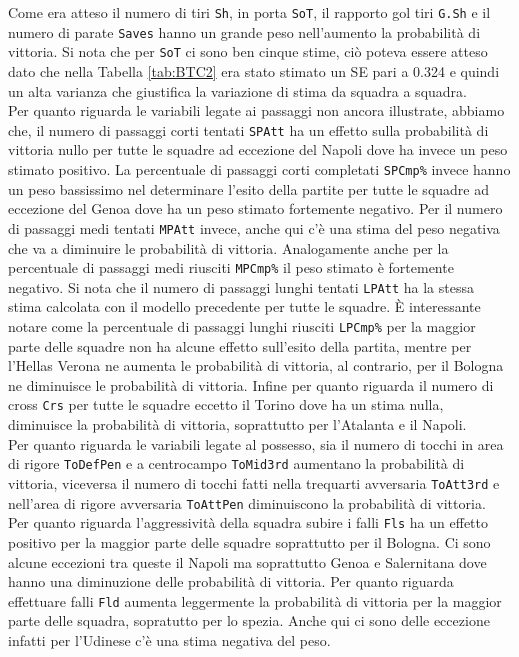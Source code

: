 Come era atteso il numero di tiri \texttt{Sh}, in porta \texttt{SoT}, il rapporto gol tiri \texttt{G.Sh} e il numero di parate \texttt{Saves} hanno un grande peso nell'aumento la probabilità di vittoria. Si nota che per \texttt{SoT} ci sono ben cinque stime, ciò poteva essere atteso dato che nella Tabella \ref{tab:BTC2} era stato stimato un SE pari a 0.324 e quindi un alta varianza che giustifica la variazione di stima da squadra a squadra. \\
Per quanto riguarda le variabili legate ai passaggi non ancora illustrate, abbiamo che,
il numero di passaggi corti tentati \texttt{SPAtt} ha un effetto sulla probabilità di vittoria nullo per tutte le squadre ad eccezione del Napoli dove ha invece un peso stimato positivo. La percentuale di passaggi corti completati \texttt{SPCmp\%} invece hanno un peso bassissimo nel determinare l'esito della partite per tutte le squadre ad eccezione del Genoa dove ha un peso stimato fortemente negativo. Per il numero di passaggi medi tentati \texttt{MPAtt} invece, anche qui c'è una stima del peso negativa che va a diminuire le probabilità di vittoria. Analogamente anche per la percentuale di passaggi medi riusciti \texttt{MPCmp\%} il peso stimato è fortemente negativo. Si nota che il numero di passaggi lunghi tentati \texttt{LPAtt} ha la stessa stima calcolata con il modello precedente per tutte le squadre. È interessante notare come la percentuale di passaggi lunghi riusciti \texttt{LPCmp\%} per la maggior parte delle squadre non ha alcune effetto sull'esito della partita, mentre per l'Hellas Verona ne aumenta le probabilità di vittoria, al contrario, per il Bologna ne diminuisce le probabilità di vittoria. Infine per quanto riguarda il numero di cross \texttt{Crs} per tutte le squadre eccetto il Torino dove ha un stima nulla, diminuisce la probabilità di vittoria, soprattutto per l'Atalanta e il Napoli.\\
Per quanto riguarda le variabili legate al possesso, sia il numero di tocchi in area di rigore \texttt{ToDefPen} e a centrocampo \texttt{ToMid3rd} aumentano la probabilità di vittoria, viceversa il numero di tocchi fatti nella trequarti avversaria \texttt{ToAtt3rd} e nell'area di rigore avversaria \texttt{ToAttPen} diminuiscono la probabilità di vittoria.\\
Per quanto riguarda l'aggressività della squadra subire i falli \texttt{Fls} ha un effetto positivo per la maggior parte delle squadre soprattutto per il Bologna. Ci sono alcune eccezioni tra queste il Napoli ma soprattutto Genoa e Salernitana dove hanno una diminuzione delle probabilità di vittoria. Per quanto riguarda effettuare falli \texttt{Fld} aumenta leggermente la probabilità di vittoria per la maggior parte delle squadra, sopratutto per lo spezia. Anche qui ci sono delle eccezione infatti per l'Udinese c'è una stima negativa del peso.\\
